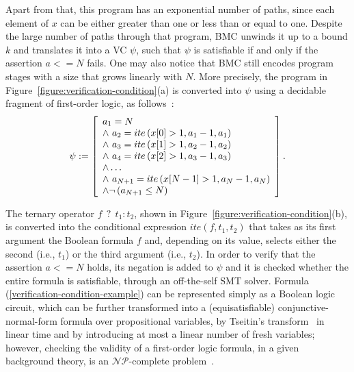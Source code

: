 \documentclass{cta-author}
\begin{document}
Apart from that, this program has an exponential number of paths, since each element of $x$ can be either greater than one or less than or equal to one. Despite the large number of paths through that program, BMC unwinds it up to a bound $k$ and translates it into a VC $\psi$, such that $\psi$ is satisfiable if and only if the assertion $a<=N$ fails. One may also notice that BMC still encodes program stages with a size that grows linearly with $N$. More precisely, the program in Figure~\ref{figure:verification-condition}(a) is converted into $\psi$ using a decidable fragment of first-order logic, as follows~\cite{Bradley07}:
%
\begin{equation}              
\label{verification-condition-example}
\psi := \left [ \begin{array}{ll} 
a_{1} = N  \\
\wedge \, \, a_{2} = ite\left(x[0] > 1, a_{1} - 1, a_{1}\right) \\ 
\wedge \, \, a_{3} = ite\left(x[1] > 1, a_{2} - 1, a_{2}\right) \\
\wedge \, \, a_{4} = ite\left(x[2] > 1, a_{3} - 1, a_{3}\right) \\
\wedge \ldots \\
\wedge \, \, a_{N+1} = ite\left(x[N-1] > 1, a_{N} - 1 , a_{N}\right) \\
\wedge \neg \left(a_{N+1} \leq N\right) \\
\end{array} \right ].  \\
\\           
\end{equation}

The ternary operator $f \: \: ? \: \: t_1 : t_2$, shown in Figure~\ref{figure:verification-condition}(b), is converted into the conditional expression $\mathit{ite}(f, t_1, t_2)$ that takes as its first argument the Boolean formula $f$ and, depending on its value, selects either the second (i.e., $t_1$) or the third argument (i.e., $t_2$). In order to verify that the assertion $a<=N$ holds, its negation is added to $\psi$ and it is checked whether the entire formula is satisfiable, through an off-the-self SMT solver. Formula (\ref{verification-condition-example}) can be represented simply as a Boolean logic circuit, which can be further transformed into a (equisatisfiable) conjunctive-normal-form formula over propositional variables, by Tseitin's transform~\cite{Tseitin83} in linear time and by introducing at most a linear number of fresh variables; however, checking the validity of a first-order logic formula, in a given background theory, is an ${\mathcal{NP}}$-complete problem~\cite{PatarinG97}.
\end{document}
